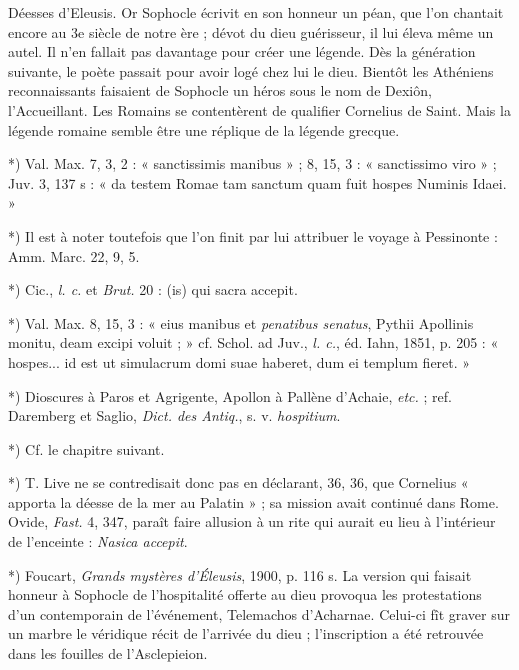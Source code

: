 \documentclass[a4paper, 11pt, oneside, polutonikogreek, french]{article}
\begin{document}
Déesses d'Eleusis. Or Sophocle écrivit en son honneur un péan, que l'on chantait encore au 3e siècle de notre ère ; dévot du dieu guérisseur, il lui éleva même un autel. Il n'en fallait pas davantage pour créer une légende. Dès la génération suivante, le poète passait pour avoir logé chez lui le dieu. Bientôt les Athéniens reconnaissants faisaient de Sophocle un héros sous le nom de Dexiôn, l'Accueillant. Les Romains se contentèrent de qualifier Cornelius de Saint. Mais la légende romaine semble être une réplique de la légende grecque.

*) Val. Max. 7, 3, 2 : « sanctissimis manibus » ; 8, 15, 3 : « sanctissimo viro » ; Juv. 3, 137 s : « da testem Romae tam sanctum quam fuit hospes Numinis Idaei. »

*) Il est à noter toutefois que l'on finit par lui attribuer le voyage à Pessinonte : Amm. Marc. 22, 9, 5.

*) Cic., \emph{l. c.} et \emph{Brut.} 20 : (is) qui sacra accepit.

*) Val. Max. 8, 15, 3 : « eius manibus et \emph{penatibus senatus}, Pythii Apollinis monitu, deam excipi voluit ; » cf. Schol. ad Juv., \emph{l. c.}, éd. Iahn, 1851, p. 205 : « hospes... id est ut simulacrum domi suae haberet, dum ei templum fieret. »

*) Dioscures à Paros et Agrigente, Apollon à Pallène d'Achaie, \emph{etc.} ; ref. Daremberg et Saglio, \emph{Dict. des Antiq.}, s. v. \emph{hospitium}.

*) Cf. le chapitre suivant.

*) T. Live ne se contredisait donc pas en déclarant, 36, 36, que Cornelius « apporta la déesse de la mer au Palatin » ; sa mission avait continué dans Rome. Ovide, \emph{Fast.} 4, 347, paraît faire allusion à un rite qui aurait eu lieu à l'intérieur de l'enceinte : \emph{Nasica accepit}.

*) Foucart, \emph{Grands mystères d'Éleusis}, 1900, p. 116 s. La version qui faisait honneur à Sophocle de l'hospitalité offerte au dieu provoqua les protestations d'un contemporain de l'événement, Telemachos d'Acharnae. Celui-ci fît graver sur un marbre le véridique récit de l'arrivée du dieu ; l'inscription a été retrouvée dans les fouilles de l'Asclepieion.
\end{document}
